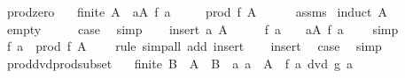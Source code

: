 \begin{isabellebody}
\isanewline
{}\isamarkupfalse%
\ prod{\isacharunderscore}{\kern0pt}zero{\isacharcolon}{\kern0pt}\isanewline
\ \ \ {\isachardoublequoteopen}finite\ A{\isachardoublequoteclose}\ \ {\isachardoublequoteopen}{\isasymexists}a{\isasymin}A{\isachardot}{\kern0pt}\ f\ a\ {\isacharequal}{\kern0pt}\ {}{\isachardoublequoteclose}\isanewline
\ \ \ {\isachardoublequoteopen}prod\ f\ A\ {\isacharequal}{\kern0pt}\ {}{\isachardoublequoteclose}\isanewline
%
\isadelimproof
\ \ %
\endisadelimproof
%
\isatagproof
{}\isamarkupfalse%
\ assms\isanewline
{}\isamarkupfalse%
\ {\isacharparenleft}{\kern0pt}induct\ A{\isacharparenright}{\kern0pt}\isanewline
\ \ \isamarkupfalse%
\ empty\isanewline
\ \ \isamarkupfalse%
\ \isamarkupfalse%
\ {\isacharquery}{\kern0pt}case\ \isamarkupfalse%
\ simp\isanewline
{}\isamarkupfalse%
\isanewline
\ \ \isamarkupfalse%
\ {\isacharparenleft}{\kern0pt}insert\ a\ A{\isacharparenright}{\kern0pt}\isanewline
\ \ \isamarkupfalse%
\ \isamarkupfalse%
\ {\isachardoublequoteopen}f\ a\ {\isacharequal}{\kern0pt}\ {}\ {\isasymor}\ {\isacharparenleft}{\kern0pt}{\isasymexists}a{\isasymin}A{\isachardot}{\kern0pt}\ f\ a\ {\isacharequal}{\kern0pt}\ {}{\isacharparenright}{\kern0pt}{\isachardoublequoteclose}\ \isamarkupfalse%
\ simp\isanewline
\ \ \isamarkupfalse%
\ \isamarkupfalse%
\ {\isachardoublequoteopen}f\ a\ {\isacharasterisk}{\kern0pt}\ prod\ f\ A\ {\isacharequal}{\kern0pt}\ {}{\isachardoublequoteclose}\ \isamarkupfalse%
\ rule\ {\isacharparenleft}{\kern0pt}simp{\isacharunderscore}{\kern0pt}all\ add{\isacharcolon}{\kern0pt}\ insert{\isacharparenright}{\kern0pt}\isanewline
\ \ \isamarkupfalse%
\ insert\ \isamarkupfalse%
\ {\isacharquery}{\kern0pt}case\ \isamarkupfalse%
\ simp\isanewline
{}\isamarkupfalse%
%
\endisatagproof
{\isafoldproof}%
%
\isadelimproof
\isanewline
%
\endisadelimproof
\isanewline
{}\isamarkupfalse%
\ prod{\isacharunderscore}{\kern0pt}dvd{\isacharunderscore}{\kern0pt}prod{\isacharunderscore}{\kern0pt}subset{}{\isacharcolon}{\kern0pt}\isanewline
\ \ \ {\isachardoublequoteopen}finite\ B{\isachardoublequoteclose}\ \ {\isachardoublequoteopen}A\ {\isasymsubseteq}\ B{\isachardoublequoteclose}\ \ {\isachardoublequoteopen}{\isasymAnd}a{\isachardot}{\kern0pt}\ a\ {\isasymin}\ A\ {\isasymLongrightarrow}\ f\ a\ dvd\ g\ a{\isachardoublequoteclose}\isanewline

\end{isabellebody}
